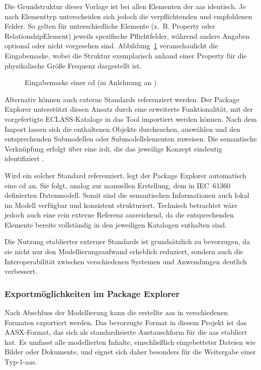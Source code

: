 Die Grundstruktur dieser Vorlage ist bei allen Elementen der \acs{aas} identisch.
Je nach Elementtyp unterscheiden sich jedoch die verpflichtenden und empfohlenen Felder.
So gelten für unterschiedliche Elemente (z.~B. Property oder RelationshipElement) jeweils spezifische Pflichtfelder, während andere Angaben optional oder nicht vorgesehen sind.
Abbildung~\ref{fig:SubmodellTypenschild} veranschaulicht die Eingabemaske, wobei die Struktur exemplarisch anhand einer Property für die physikalische Größe Frequenz dargestellt ist.

\vspace{0.25em}
\begin{figure}[htbp]
    \centering
    
    \vspace{-0.5em}
    \caption[Eingabemaske einer \acs{cd}]{Eingabemaske einer \acs{cd} (in Anlehnung an \cite{SpezifikationPart3a})}
    \label{fig:SubmodellTypenschild}
\end{figure}
\vspace{-0.35em}

Alternativ können auch externe Standards referenziert werden. 
Der Package Explorer unterstützt diesen Ansatz durch eine erweiterte Funktionalität, mit der vorgefertigte ECLASS-Kataloge in das Tool importiert werden können. 
Nach dem Import lassen sich die enthaltenen Objekte durchsuchen, auswählen und den entsprechenden Submodellen oder Submodellelementen zuweisen. 
Die semantische Verknüpfung erfolgt über eine \acs{irdi}, die das jeweilige Konzept eindeutig identifiziert \cite{eclass_irdi}.

Wird ein solcher Standard referenziert, legt der Package Explorer automatisch eine \acs{cd} an. 
Sie folgt, analog zur manuellen Erstellung, dem in IEC~61360 definierten Datenmodell. 
Somit sind die semantischen Informationen auch lokal im Modell verfügbar und konsistent strukturiert. 
Technisch betrachtet wäre jedoch auch eine rein externe Referenz ausreichend, da die entsprechenden Elemente bereits vollständig in den jeweiligen Katalogen enthalten sind.

Die Nutzung etablierter externer Standards ist grundsätzlich zu bevorzugen, da sie nicht nur den Modellierungsaufwand erheblich reduziert, sondern auch die Interoperabilität zwischen verschiedenen Systemen und Anwendungen deutlich verbessert.

\subsubsection*{Exportmöglichkeiten im Package Explorer}
\vspace{-0.5em}
Nach Abschluss der Modellierung kann die erstellte \acs{aas} in verschiedenen Formaten exportiert werden.
Das bevorzugte Format in diesem Projekt ist das AASX-Format, das sich als standardisierte Austauschform für die \acs{aas} etabliert hat.
Es umfasst alle modellierten Inhalte, einschließlich eingebetteter Dateien wie Bilder oder Dokumente, und eignet sich daher besonders für die Weitergabe einer Typ-1-\acs{aas}.


